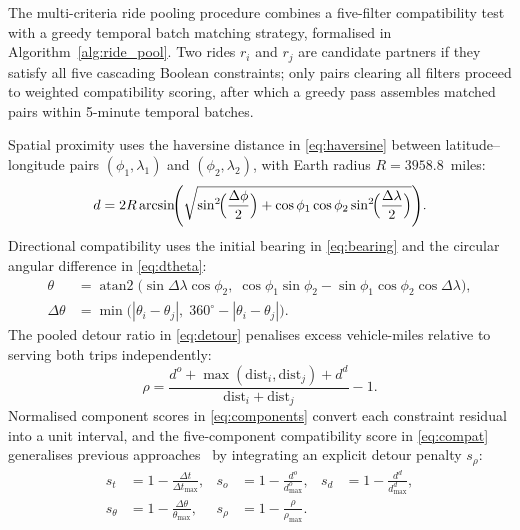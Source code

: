 The multi-criteria ride pooling procedure combines a five-filter compatibility test with a greedy temporal batch matching strategy, formalised in Algorithm~\ref{alg:ride_pool}. Two rides $r_i$ and $r_j$ are candidate partners if they satisfy all five cascading Boolean constraints; only pairs clearing all filters proceed to weighted compatibility scoring, after which a greedy pass assembles matched pairs within 5-minute temporal batches.

Spatial proximity uses the haversine distance in \eqref{eq:haversine} between latitude--longitude pairs $(\phi_1,\lambda_1)$ and $(\phi_2,\lambda_2)$, with Earth radius $R{=}3958.8$~miles:
\begin{equation}
 d = 2R\arcsin\!\Biggl(
 \sqrt{\sin^{2}\!\Bigl(\frac{\Delta\phi}{2}\Bigr)
 + \cos\phi_1\cos\phi_2\sin^{2}\!\Bigl(\frac{\Delta\lambda}{2}\Bigr)}
 \Biggr).
 \label{eq:haversine}
\end{equation}
Directional compatibility uses the initial bearing in \eqref{eq:bearing} and the circular angular difference in \eqref{eq:dtheta}:
\begin{align}
 \theta &= \operatorname{atan2}\!\bigl(
 \sin\Delta\lambda\cos\phi_2,\;
 \cos\phi_1\sin\phi_2 - \sin\phi_1\cos\phi_2\cos\Delta\lambda
 \bigr),
 \label{eq:bearing} \\
 \Delta\theta &= \min\bigl(|\theta_i-\theta_j|,\; 360^{\circ}-|\theta_i-\theta_j|\bigr).
 \label{eq:dtheta}
\end{align}
The pooled detour ratio in \eqref{eq:detour} penalises excess vehicle-miles relative to serving both trips independently:
\begin{equation}
 \rho = \frac{d^{o} + \max(\mathrm{dist}_i,\mathrm{dist}_j) + d^{d}}{\mathrm{dist}_i + \mathrm{dist}_j} - 1.
 \label{eq:detour}
\end{equation}
Normalised component scores in \eqref{eq:components} convert each constraint residual into a unit interval, and the five-component compatibility score in \eqref{eq:compat} generalises previous approaches~\parencite{furuhata2013ridesharing} by integrating an explicit detour penalty $s_\rho$:
\begin{equation}
 \begin{aligned}
 s_t &= 1 - \frac{\Delta t}{\Delta t_{\max}}, &
 s_o &= 1 - \frac{d^{o}}{d^{o}_{\max}}, &
 s_d &= 1 - \frac{d^{d}}{d^{d}_{\max}}, \\
 s_\theta &= 1 - \frac{\Delta\theta}{\theta_{\max}}, &
 s_\rho &= 1 - \frac{\rho}{\rho_{\max}}.
 \end{aligned}
 \label{eq:components}
\end{equation}
